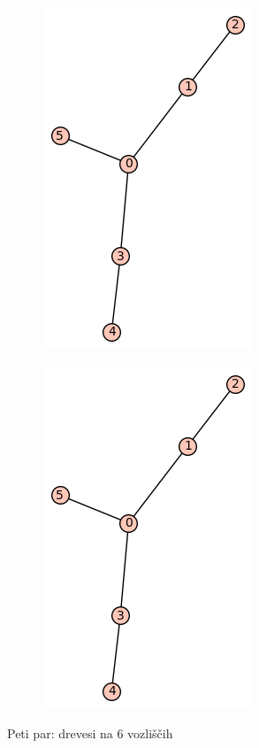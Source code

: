\documentclass[12pt, a4paper]{article}
\begin{document}
\begin{center}
\begin{center}
\begin{figure}[!htb]
\centering
\begin{subfigure}{0.5\textwidth}
  \centering
  \includegraphics[width=0.4\linewidth]{t-11}
\end{subfigure}%
\begin{subfigure}{0.5\textwidth}
  \centering
  \includegraphics[width=0.5\linewidth]{t-11}
\end{subfigure}
\caption{Peti par: drevesi na 6 vozliščih}
\label{fig:test}
\end{figure}
\end{center}


\end{center}
\end{document}
